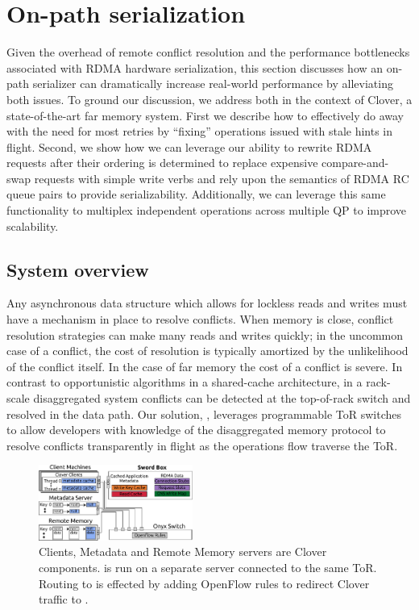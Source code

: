 \section{On-path serialization}

Given the overhead of remote conflict resolution and the performance
bottlenecks associated with RDMA hardware serialization, this section
discusses how an on-path serializer can dramatically increase
real-world performance by alleviating both issues.  To ground our
discussion, we address both in the context of Clover, a
state-of-the-art far memory system. First we describe how to
effectively do away with the need for most retries by ``fixing''
operations issued with stale hints in flight.  Second, we show how we
can leverage our ability to rewrite RDMA requests after their ordering
is determined to replace expensive compare-and-swap requests with
simple write verbs and rely upon the semantics of RDMA RC queue pairs
to provide serializability.  Additionally, we can leverage this same
functionality to multiplex independent operations across multiple QP
to improve scalability.

\subsection{System overview}

Any asynchronous data structure which allows for lockless reads and
writes must have a mechanism in place to resolve conflicts. When
memory is close, conflict resolution strategies can make many reads
and writes quickly; in the uncommon case of a conflict, the cost of
resolution is typically amortized by the unlikelihood of the conflict
itself. In the case of far memory the cost of a conflict is severe. In
contrast to opportunistic algorithms in a shared-cache architecture,
in a rack-scale disaggregated system conflicts can be detected at the
top-of-rack switch and resolved in the data path. Our solution,
\sword, leverages programmable ToR switches to allow developers with
knowledge of the disaggregated memory protocol to resolve conflicts
transparently in flight as the operations flow traverse the ToR.

\begin{figure}
\center
  \includegraphics[width=0.45\textwidth]{fig/overview_2.pdf}
 
\caption{Clients, Metadata and Remote Memory servers are
Clover components. {\sword} is run on a separate server connected to the same ToR.
Routing to {\sword} is effected by adding OpenFlow rules to redirect Clover traffic to \sword.}
\label{fig:overview} \end{figure}

